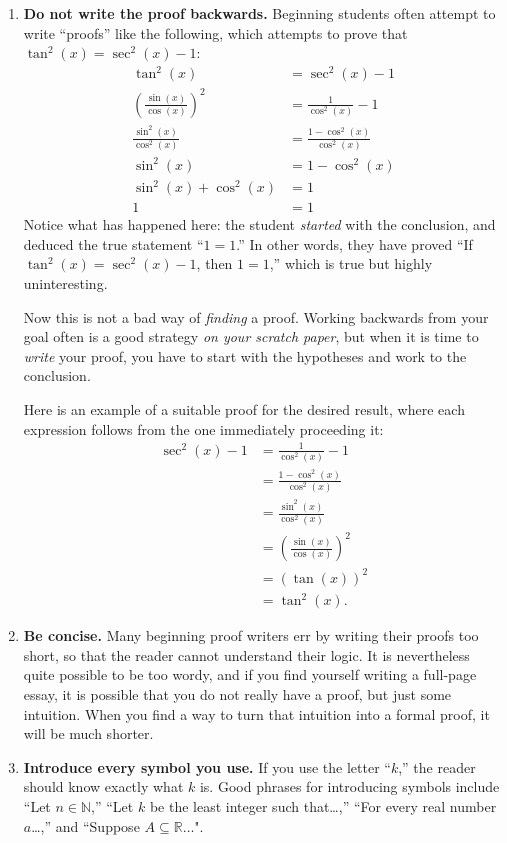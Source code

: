 \documentclass[11pt]{article}
\begin{document}
\begin{enumerate}
\item \textbf{Do not write the proof backwards.}
Beginning students often attempt to write ``proofs'' like the following, which attempts to prove that $\tan^2(x)  = \sec^2(x) - 1$:
\begin{align*}
\tan^2(x) & = \sec^2(x) - 1 \\
\left(\frac{\sin(x)}{\cos(x)}\right)^2 & = \frac{1}{\cos^2(x)} - 1 \\
\frac{\sin^2(x)}{\cos^2(x)} & =  \frac{1-\cos^2(x)}{\cos^2(x)} \\
\sin^2(x) & = 1-\cos^2(x) \\
\sin^2(x) + \cos^2(x) & = 1 \\
1 & = 1
\end{align*}        
Notice what has happened here:  the student \emph{started} with the conclusion, and deduced the true statement ``$1=1$.'' In other words, they have proved ``If $\tan^2(x) = \sec^2(x) - 1$, then $1=1$,'' which is true but highly uninteresting.
        
Now this is not a bad way of \emph{finding} a proof. Working backwards from your goal often is a good strategy \emph{on your scratch paper}, but when it is time to \emph{write} your proof, you have to start with the hypotheses and work to the conclusion.

Here is an example of a suitable proof for the desired result, where each expression follows from the one immediately proceeding it:
\begin{align*}
\sec^2(x) - 1 & = \frac{1}{\cos^2(x)} - 1\\
& = \frac{1-\cos^2(x)}{\cos^2(x)} \\
& = \frac{\sin^2(x)}{\cos^2(x)} \\
& = \left(\frac{\sin(x)}{\cos(x)}\right)^2 \\
& = \left(\tan(x)\right)^2 \\
& = \tan^2(x).
\end{align*}

\item \textbf{Be concise.}
Many beginning proof writers err by writing their proofs too short, so that the reader cannot understand their logic. It is nevertheless quite possible to be too wordy, and if you find yourself writing a full-page essay, it is possible that you do not really have a proof, but just some intuition. When you find a way to turn that intuition into a formal proof, it will be much shorter.

\item \textbf{Introduce every symbol you use.}
If you use the letter ``$k$,'' the reader should know exactly what $k$ is. Good phrases for introducing symbols include ``Let $n\in \mathbb{N}$,'' ``Let $k$ be the least integer such that\ldots,'' ``For every real number $a$\ldots,'' and ``Suppose $A\subseteq\mathbb{R}\ldots$".
          

\end{enumerate}
\end{document}
